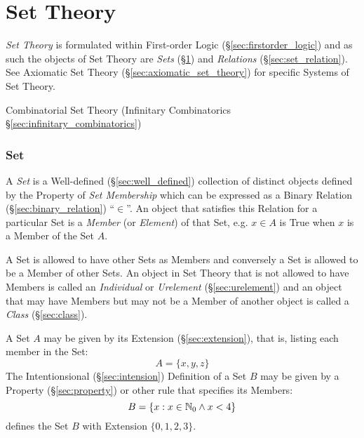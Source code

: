 \part{Set Theory}\label{part:set_theory}

\emph{Set Theory} is formulated within First-order Logic
(\S\ref{sec:firstorder_logic}) and as such the objects of Set Theory
are \emph{Sets} (\S\ref{sec:set}) and \emph{Relations}
(\S\ref{sec:set_relation}). See Axiomatic Set Theory
(\S\ref{sec:axiomatic_set_theory}) for specific Systems of Set Theory.

Combinatorial Set Theory (Infinitary Combinatorics
\S\ref{sec:infinitary_combinatorics})



\section{Set}\label{sec:set}

A \emph{Set} is a Well-defined (\S\ref{sec:well_defined}) collection
of distinct objects defined by the Property of \emph{Set Membership}
which can be expressed as a Binary Relation
(\S\ref{sec:binary_relation}) ``$\in$''. An object that satisfies this
Relation for a particular Set is a \emph{Member} (or \emph{Element})
of that Set, e.g. $x \in A$ is True when $x$ is a Member of the Set
$A$.

A Set is allowed to have other Sets as Members and conversely a Set is
allowed to be a Member of other Sets. An object in Set Theory that is
not allowed to have Members is called an \emph{Individual} or
\emph{Urelement} (\S\ref{sec:urelement}) and an object that may have
Members but may not be a Member of another object is called a
\emph{Class} (\S\ref{sec:class}).

A Set $A$ may be given by its Extension (\S\ref{sec:extension}), that
is, listing each member in the Set:
\[
  A = \{x,y,z\}
\]
The Intentionsional (\S\ref{sec:intension}) Definition of a Set $B$
may be given by a Property (\S\ref{sec:property}) or other rule that
specifies its Members:
\[
  B = \{ x : x \in \mathbb{N}_0 \wedge x < 4 \}
\]
defines the Set $B$ with Extension $\{ 0, 1, 2, 3 \}$.

